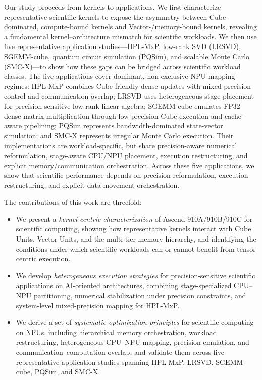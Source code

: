 \documentclass{article}
\newcommand{\rev}[1]{#1}
\begin{document}
Our study proceeds from kernels to applications. We first characterize representative scientific kernels to expose the asymmetry between Cube-dominated, compute-bound kernels and Vector-/memory-bound kernels, revealing a fundamental kernel--architecture mismatch for scientific workloads. We then use five representative application studies---HPL-MxP, low-rank SVD (LRSVD), SGEMM-cube, quantum circuit simulation (PQSim), and scalable Monte Carlo (SMC-X)---to show how these gaps can be bridged across scientific workload classes. \rev{The five applications cover dominant, non-exclusive NPU mapping regimes: HPL-MxP combines Cube-friendly dense updates with mixed-precision control and communication overlap; LRSVD uses heterogeneous stage placement for precision-sensitive low-rank linear algebra; SGEMM-cube emulates FP32 dense matrix multiplication through low-precision Cube execution and cache-aware pipelining; PQSim represents bandwidth-dominated state-vector simulation; and SMC-X represents irregular Monte Carlo execution. Their implementations are workload-specific, but share precision-aware numerical reformulation, stage-aware CPU/NPU placement, execution restructuring, and explicit memory/communication orchestration.} Across these five applications, we show that scientific performance depends on precision reformulation, execution restructuring, and explicit data-movement orchestration.

The contributions of this work are threefold:
\begin{itemize}
\item We present a \emph{kernel-centric characterization} of Ascend 910A/910B/910C for scientific computing, showing how representative kernels interact with Cube Units, Vector Units, and the multi-tier memory hierarchy, and identifying the conditions under which scientific workloads can or cannot benefit from tensor-centric execution.

\item We develop \emph{heterogeneous execution strategies} for precision-sensitive scientific applications on AI-oriented architectures, combining stage-specialized CPU--NPU partitioning, numerical stabilization under precision constraints, and \rev{system-level mixed-precision mapping for HPL-MxP}.

\item We derive a set of \emph{systematic optimization principles} for scientific computing on NPUs, including hierarchical memory orchestration, workload restructuring, heterogeneous CPU--NPU mapping, precision emulation, and communication--computation overlap, and validate them across five representative application studies spanning HPL-MxP, LRSVD, SGEMM-cube, PQSim, and SMC-X.
\end{itemize}
\end{document}
